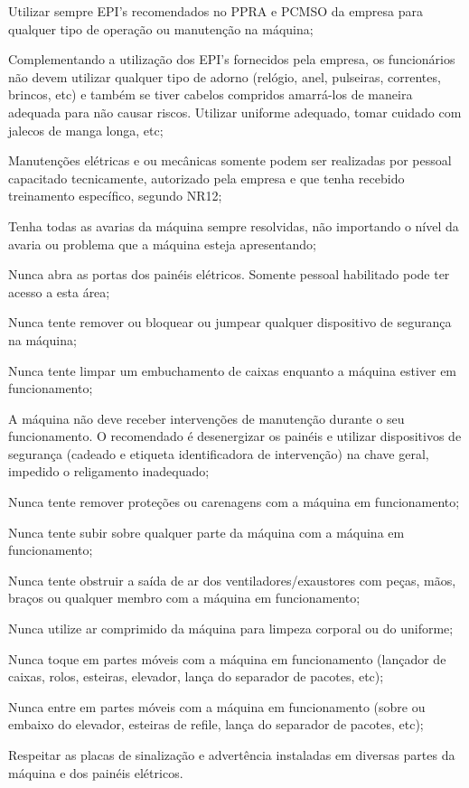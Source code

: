 \begin{generalSafetyRules}
    \item[\ding{\dingNumber}] Utilizar sempre EPI's recomendados no PPRA e PCMSO da empresa para qualquer tipo de operação ou
manutenção na máquina;
    \item[\ding{\dingNumber}]  Complementando a utilização dos EPI's fornecidos pela empresa, os funcionários não devem utilizar
qualquer tipo de adorno (relógio, anel, pulseiras, correntes, brincos, etc) e também se tiver cabelos compridos
amarrá-los de maneira adequada para não causar riscos. Utilizar uniforme adequado, tomar cuidado com jalecos
de manga longa, etc;
    \item[\ding{\dingNumber}] Manutenções elétricas e ou mecânicas somente podem ser realizadas por pessoal capacitado
tecnicamente, autorizado pela empresa e que tenha recebido treinamento específico, segundo NR12;
    \item[\ding{\dingNumber}] Tenha todas as avarias da máquina sempre resolvidas, não importando o nível da avaria ou problema que a
máquina esteja apresentando;
    \item[\ding{\dingNumber}] Nunca abra as portas dos painéis elétricos. Somente pessoal habilitado pode ter acesso a esta área;
    \item[\ding{\dingNumber}] Nunca tente remover ou bloquear ou jumpear qualquer dispositivo de segurança na máquina;
    \item[\ding{\dingNumber}] Nunca tente limpar um embuchamento de caixas enquanto a máquina estiver em funcionamento;
    \item[\ding{\dingNumber}] A máquina não deve receber intervenções de manutenção durante o seu funcionamento. O recomendado é
desenergizar os painéis e utilizar dispositivos de segurança (cadeado e etiqueta identificadora de intervenção) na
chave geral, impedido o religamento inadequado;
    \item[\ding{\dingNumber}] Nunca tente remover proteções ou carenagens com a máquina em funcionamento;
    \item[\ding{\dingNumber}] Nunca tente subir sobre qualquer parte da máquina com a máquina em funcionamento;
    \item[\ding{\dingNumber}] Nunca tente obstruir a saída de ar dos ventiladores/exaustores com peças, mãos, braços ou qualquer
membro com a máquina em funcionamento;
    \item[\ding{\dingNumber}] Nunca utilize ar comprimido da máquina para limpeza corporal ou do uniforme;
    \item[\ding{\dingNumber}] Nunca toque em partes móveis com a máquina em funcionamento (lançador de caixas, rolos, esteiras,
elevador, lança do separador de pacotes, etc);
    \item[\ding{\dingNumber}] Nunca entre em partes móveis com a máquina em funcionamento (sobre ou embaixo do elevador, esteiras
de refile, lança do separador de pacotes, etc);
    \item[\ding{\dingNumber}] Respeitar as placas de sinalização e advertência instaladas em diversas partes da máquina e dos painéis
elétricos.




\end{generalSafetyRules}
